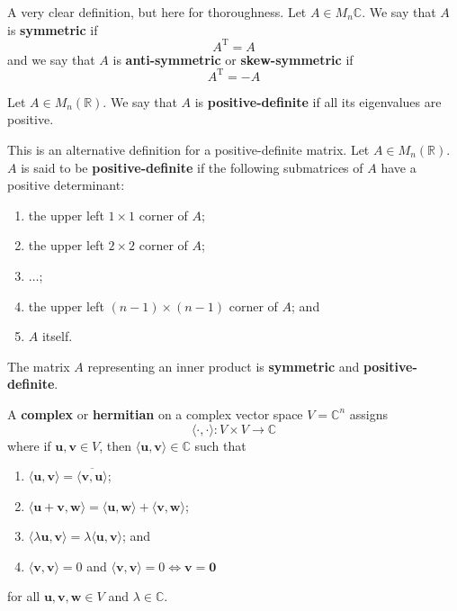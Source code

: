 \begin{definition}
    A very clear definition, but here for thoroughness. Let $A \in M_n{\mathbb{C}}$. We say that $A$ is \textbf{symmetric} if \[ A^{\mathrm{T}} = A \] and we say that $A$ is \textbf{anti-symmetric} or \textbf{skew-symmetric} if \[ A^{\mathrm{T}} = -A \]
\end{definition}

\begin{definition}
    Let $A \in M_n(\mathbb{R})$. We say that $A$ is \textbf{positive-definite} if all its eigenvalues are positive. 
\end{definition}

\begin{definition}
    This is an alternative definition for a positive-definite matrix. Let $A \in M_{n}(\mathbb{R})$. $A$ is said to be \textbf{positive-definite} if the following submatrices of $A$ have a positive determinant:
    \begin{enumerate}
        \item the upper left $1 \times 1$ corner of $A$;
        \item the upper left $2 \times 2$ corner of $A$;
        \item $\ldots$;
        \item the upper left $(n - 1) \times (n - 1)$ corner of $A$; and
        \item $A$ itself.
    \end{enumerate}
\end{definition}

\begin{proposition}
    The matrix $A$ representing an inner product is \textbf{symmetric} and \textbf{positive-definite}.
\end{proposition}

\begin{definition}
    A \textbf{complex} or \textbf{hermitian} on a complex vector space $V = \mathbb{C}^n$ assigns \[ \langle \cdot, \cdot \rangle : V \times V \to \mathbb{C} \] where if $\bm{u}, \bm{v} \in V$, then $\langle \bm{u}, \bm{v} \rangle \in \mathbb{C}$ such that 
    \begin{enumerate}
        \item $\langle \bm{u}, \bm{v} \rangle = \overline{\langle \bm{v}, \bm{u} \rangle}$;
        \item $\langle \bm{u} + \bm{v}, \bm{w} \rangle = \langle \bm{u}, \bm{w} \rangle + \langle \bm{v}, \bm{w} \rangle$; 
        \item $\langle \lambda \bm{u}, \bm{v} \rangle = \lambda \langle \bm{u}, \bm{v} \rangle$; and
        \item $\langle \bm{v}, \bm{v} \rangle = 0$ and $\langle \bm{v}, \bm{v} \rangle = 0 \iff \bm{v} = \bm{0}$
    \end{enumerate}
    for all $\bm{u}, \bm{v}, \bm{w} \in V$ and $\lambda \in \mathbb{C}$.
\end{definition}

